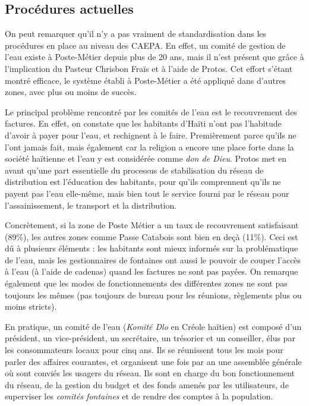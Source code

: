 \documentclass{EPL-master-thesis-covers-FR}
\begin{document}

			\subsection*{Procédures actuelles}
				\label{sec:procedures_actuelles}

				On peut remarquer qu'il n'y a pas vraiment de standardisation dans les procédures en place au niveau des CAEPA. En effet, un comité de gestion de l'eau existe à Poste-Métier depuis plus de 20 ans, mais il n'est présent que grâce à l'implication du Pasteur Chrisbon Fraïs et à l'aide de Protos. Cet effort s'étant montré efficace, le système établi à Poste-Métier a été appliqué dans d'autres zones, avec plus ou moins de succès.

				Le principal problème rencontré par les comités de l'eau est le recouvrement des factures. En effet, on constate que les habitants d'Haïti n'ont pas l'habitude d'avoir à payer pour l'eau, et rechignent à le faire. Premièrement parce qu'ils ne l'ont jamais fait, mais également car la religion a encore une place forte dans la société haïtienne et l'eau y est considérée comme \emph{don de Dieu}. Protos met en avant qu'une part essentielle du processus de stabilisation du réseau de distribution est l'éducation des habitants, pour qu'ils comprennent qu'ils ne payent pas l'eau elle-même, mais bien tout le service fourni par le réseau pour l'assainissement, le transport et la distribution.

				Concrètement, si la zone de Poste Métier a un taux de recouvrement satisfaisant (89\%), les autres zones comme Passe Catabois sont bien en deçà (11\%). Ceci est dû à plusieurs éléments : les habitants sont mieux informés sur la problématique de l'eau, mais les gestionnaires de fontaines ont aussi le pouvoir de couper l'accès à l'eau (à l'aide de cadenas) quand les factures ne sont pas payées. On remarque également que les modes de fonctionnements des différentes zones ne sont pas toujours les mêmes (pas toujours de bureau pour les réunions, règlements plus ou moins stricts).

				En pratique, un comité de l'eau (\emph{Komité Dlo} en Créole haïtien) est composé d'un président, un vice-président, un secrétaire, un trésorier et un conseiller, élus par les consommateurs locaux pour cinq ans. Ils se réunissent tous les mois pour parler des affaires courantes, et organisent une fois par an une assemblée générale où sont conviés les usagers du réseau. Ils sont en charge du bon fonctionnement du réseau, de la gestion du budget et des fonds amenés par les utilisateurs, de superviser les \emph{comités fontaines} et de rendre des comptes à la population.
\end{document}
